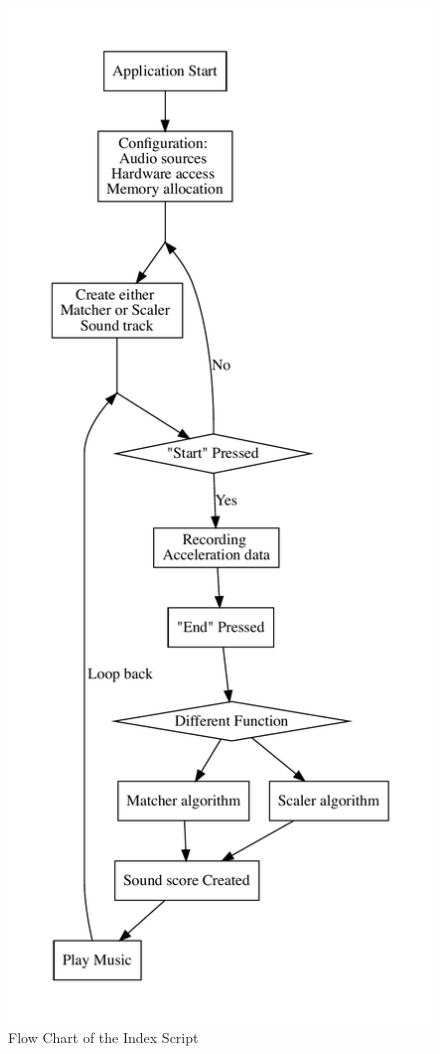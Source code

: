 \begin{figure}[H]
\begin{minipage}[b]{0.5\linewidth}
\centering
\includegraphics[height=0.95\textheight]{figWR/a}
\caption{Flow Chart of the Index Script}

\end{minipage}
\end{figure}
